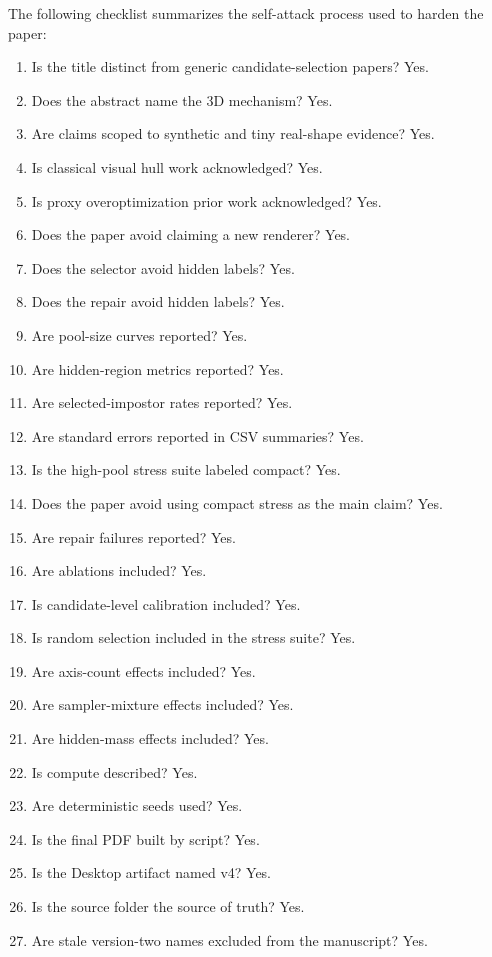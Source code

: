 \documentclass{article}
\begin{document}
The following checklist summarizes the self-attack process used to harden the
paper:
\begin{enumerate}
  \item Is the title distinct from generic candidate-selection papers? Yes.
  \item Does the abstract name the 3D mechanism? Yes.
  \item Are claims scoped to synthetic and tiny real-shape evidence? Yes.
  \item Is classical visual hull work acknowledged? Yes.
  \item Is proxy overoptimization prior work acknowledged? Yes.
  \item Does the paper avoid claiming a new renderer? Yes.
  \item Does the selector avoid hidden labels? Yes.
  \item Does the repair avoid hidden labels? Yes.
  \item Are pool-size curves reported? Yes.
  \item Are hidden-region metrics reported? Yes.
  \item Are selected-impostor rates reported? Yes.
  \item Are standard errors reported in CSV summaries? Yes.
  \item Is the high-pool stress suite labeled compact? Yes.
  \item Does the paper avoid using compact stress as the main claim? Yes.
  \item Are repair failures reported? Yes.
  \item Are ablations included? Yes.
  \item Is candidate-level calibration included? Yes.
  \item Is random selection included in the stress suite? Yes.
  \item Are axis-count effects included? Yes.
  \item Are sampler-mixture effects included? Yes.
  \item Are hidden-mass effects included? Yes.
  \item Is compute described? Yes.
  \item Are deterministic seeds used? Yes.
  \item Is the final PDF built by script? Yes.
  \item Is the Desktop artifact named v4? Yes.
  \item Is the source folder the source of truth? Yes.
  \item Are stale version-two names excluded from the manuscript? Yes.

\end{enumerate}
\end{document}

